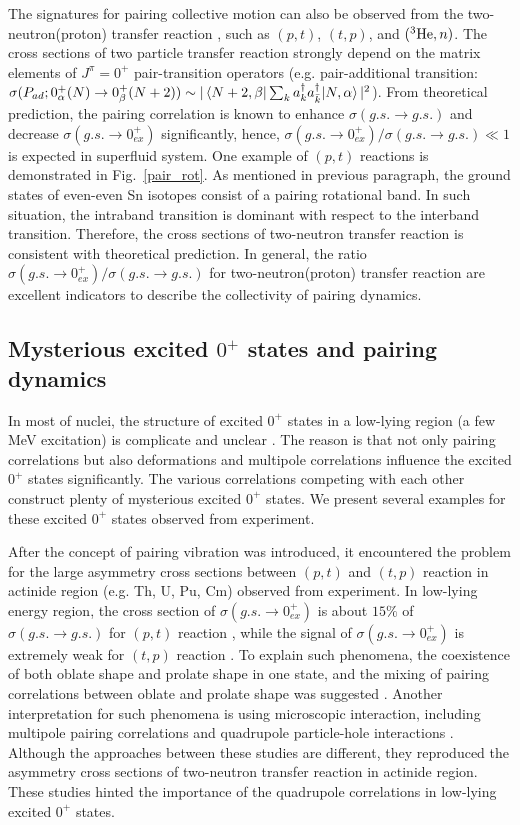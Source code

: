 \documentclass[11pt]{book} %
\begin{document}
The signatures for pairing collective motion can also be observed from the two-neutron(proton) transfer reaction \cite{BHR73}, such as $(p, t)$, $(t, p)$, and $({}^3{\rm He}, n)$. The cross sections of two particle transfer reaction strongly depend on the matrix elements of $J^{\pi}=0^+$ pair-transition operators (e.g. pair-additional transition: $\sigma( P_{ad};0_{\alpha}^+(N) \to 0_{\beta}^+(N+2))\sim |\braket{N+2,\beta|\sum_k a^{\dag}_k a^{\dag}_{\bar{k}}|N,\alpha}|^2$). From theoretical prediction, the pairing correlation is known to enhance $\sigma(g.s.\to g.s.)$ and decrease $\sigma(g.s.\to 0_{ex}^+)$ significantly, hence, $\sigma(g.s.\to 0_{ex}^+)/\sigma(g.s.\to g.s.)\ll 1$ is expected in superfluid system. One example of $(p, t)$ reactions is demonstrated in Fig.~\ref{pair_rot}. As mentioned in previous paragraph, the ground states of even-even Sn isotopes consist of a pairing rotational band. In such situation, the intraband transition is dominant with respect to the interband transition. Therefore, the cross sections of two-neutron transfer reaction is consistent with theoretical prediction. In general, the ratio $\sigma(g.s.\to 0_{ex}^+)/\sigma(g.s.\to g.s.)$ for two-neutron(proton) transfer reaction are excellent indicators to describe the collectivity of pairing dynamics.

\subsection{Mysterious excited $0^+$ states and pairing dynamics}
In most of nuclei, the structure of excited $0^+$ states in a low-lying region (a few MeV excitation) is complicate and unclear \cite{HW11}. The reason is that not only pairing correlations but also deformations and multipole correlations influence the excited $0^+$ states significantly. The various correlations competing with each other construct plenty of mysterious excited $0^+$ states. We present several examples for these excited $0^+$ states observed from experiment.

After the concept of pairing vibration was introduced, it encountered the problem for the large asymmetry cross sections between $(p, t)$ and $(t, p)$ reaction in actinide region (e.g. Th, U, Pu, Cm) observed from experiment. In low-lying energy region, the cross section of $\sigma(g.s.\to 0_{ex}^+)$ is about $15\%$ of $\sigma(g.s.\to g.s.)$ for $(p, t)$ reaction \cite{MEFSS70, MEFSS72}, while the signal of $\sigma(g.s.\to 0_{ex}^+)$ is extremely weak for $(t, p)$ reaction \cite{Cas72}. To explain such phenomena, the coexistence of both oblate shape and prolate shape in one state, and the mixing of pairing correlations between oblate and prolate shape was suggested \cite{GJV71,RK72}. Another interpretation for such phenomena is using microscopic interaction, including multipole pairing correlations and quadrupole particle-hole interactions \cite{RB76}. Although the approaches between these studies are different, they reproduced the asymmetry cross sections of two-neutron transfer reaction in actinide region. These studies hinted the importance of the quadrupole correlations in low-lying excited $0^+$ states. 
\end{document}
